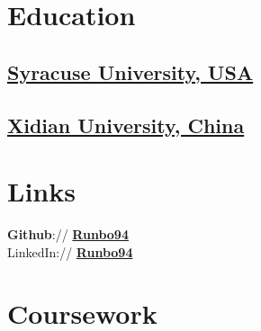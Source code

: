 \documentclass[letterpaper]{deedy-resume} %
\begin{document}
\begin{minipage}[t]{0.33\textwidth} %


\section{Education} 

\subsection{\href{https://www.syracuse.edu/}{Syracuse University, USA}}


\sectionspace %



\subsection{\href{http://en.xidian.edu.cn/}{Xidian University, China}}

\sectionspace %


\section{Links} 

\textbf{Github}:// \href{https://github.com/runbo94}{\bf Runbo94} \\
LinkedIn:// \href{https://www.linkedin.com/in/runbo94}{\bf Runbo94} \\

\sectionspace %


\section{Coursework}


\end{minipage}
\end{document}
